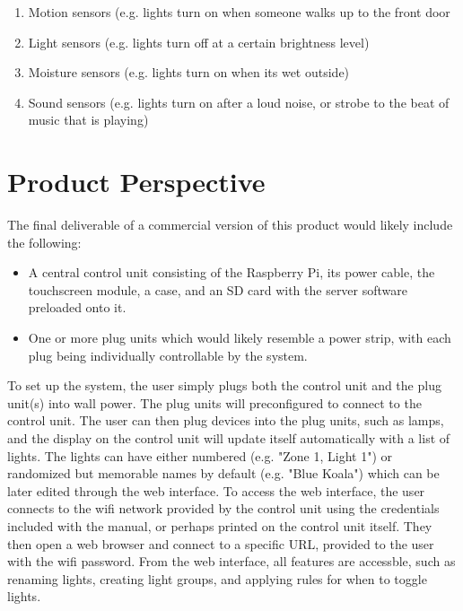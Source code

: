 \documentclass[oneside,openright]{book}
\begin{document}
\begin{enumerate}
\begin{enumerate}
\begin{enumerate}
            \item Motion sensors (e.g. lights turn on when someone walks up to
                the front door
            \item Light sensors (e.g. lights turn off at a certain brightness
                level)
            \item Moisture sensors (e.g. lights turn on when its wet outside)
            \item Sound sensors (e.g. lights turn on after a loud noise, or
                strobe to the beat of music that is playing)
        \end{enumerate}
    \end{enumerate}
\end{enumerate}

\section{Product Perspective}

The final deliverable of a commercial version of this product would likely
include the following:

\begin{itemize}
    \item A central control unit consisting of the Raspberry Pi, its power
        cable, the touchscreen module, a case, and an SD card with the server
        software preloaded onto it.
    \item One or more plug units which would likely resemble a power strip,
        with each plug being individually controllable by the system.
\end{itemize}

To set up the system, the user simply plugs both the control unit and the plug
unit(s) into wall power.  The plug units will preconfigured to connect to the
control unit.  The user can then plug devices into the plug units, such as
lamps, and the display on the control unit will update itself automatically
with a list of lights.  The lights can have either numbered (e.g. "Zone 1,
Light 1") or randomized but memorable names by default (e.g. "Blue Koala")
which can be later edited through the web interface.  To access the web
interface, the user connects to the wifi network provided by the control unit
using the credentials included with the manual, or perhaps printed on the
control unit itself.  They then open a web browser and connect to a specific
URL, provided to the user with the wifi password.  From the web interface, all
features are accessble, such as renaming lights, creating light groups, and
applying rules for when to toggle lights.
\end{document}
